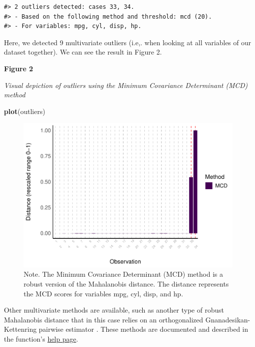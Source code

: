 \documentclass[sn-basic, lineno,pdflatex]{sn-jnl}
\newenvironment{Shaded}{\begin{snugshade}}{\end{snugshade}}
\newcommand{\FunctionTok}[1]{\textcolor[rgb]{0.13,0.29,0.53}{\textbf{#1}}}
\newcommand{\NormalTok}[1]{#1}
\begin{document}
\begin{verbatim}
#> 2 outliers detected: cases 33, 34.
#> - Based on the following method and threshold: mcd (20).
#> - For variables: mpg, cyl, disp, hp.
\end{verbatim}

Here, we detected 9 multivariate outliers (i.e,. when looking at all
variables of our dataset together). We can see the result in Figure 2.

\textbf{Figure 2}

\emph{Visual depiction of outliers using the Minimum Covariance
Determinant (MCD) method}

\begin{Shaded}
\begin{Highlighting}[]
\FunctionTok{plot}\NormalTok{(outliers)}
\end{Highlighting}
\end{Shaded}

\begin{figure}
\includegraphics[width=1\linewidth]{paper_files/figure-latex/multivariate_implicit-1} \caption{Note. The Minimum Covariance Determinant (MCD) method is a robust version of the Mahalanobis distance. The distance represents the MCD scores for variables mpg, cyl, disp, and hp.}\label{fig:multivariate_implicit}
\end{figure}

Other multivariate methods are available, such as another type of robust
Mahalanobis distance that in this case relies on an orthogonalized
Gnanadesikan-Kettenring pairwise estimator
\citep{gnanadesikan1972robust}. These methods are documented and
described in the function's
\href{https://easystats.github.io/performance/reference/check_outliers.html}{help
page}.
\end{document}
